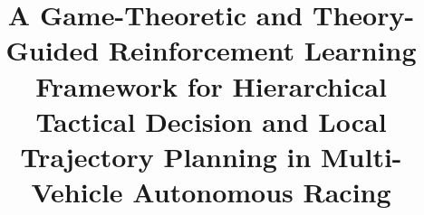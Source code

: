 \documentclass[final ,3p, times]{elsarticle}
\begin{document}




\title{A Game-Theoretic and Theory-Guided Reinforcement Learning Framework for Hierarchical Tactical Decision and Local Trajectory Planning in Multi-Vehicle Autonomous Racing}









\end{document}
